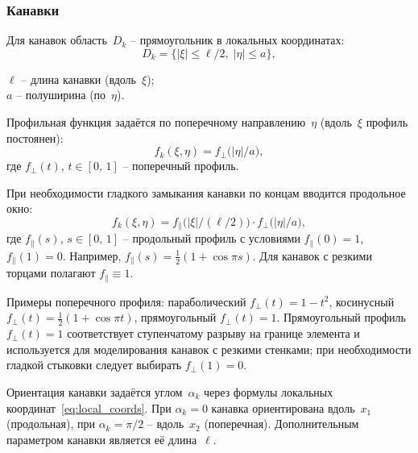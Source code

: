 
\subsubsection*{Канавки}

Для канавок область~$D_k$ -- прямоугольник в локальных координатах:
\begin{equation}
  D_k = \bigl\{|\xi| \leq \ell/2,\; |\eta| \leq a\bigr\},
  \label{eq:groove_Dk}
\end{equation}
\begin{conditions}
$\ell$ -- длина канавки (вдоль~$\xi$);\\
$a$ -- полуширина (по~$\eta$).
\end{conditions}
Профильная функция задаётся по поперечному направлению~$\eta$
(вдоль~$\xi$ профиль постоянен):
\begin{equation}
  f_k(\xi, \eta) = f_\perp\!\bigl(|\eta|/a\bigr),
  \label{eq:groove_profile}
\end{equation}
где $f_\perp(t)$, $t \in [0,\,1]$ -- поперечный профиль.

При необходимости гладкого замыкания канавки по концам вводится
продольное окно:
\begin{equation}
  f_k(\xi, \eta)
    = f_\parallel\!\bigl(|\xi|/(\ell/2)\bigr)
      \cdot f_\perp\!\bigl(|\eta|/a\bigr),
  \label{eq:groove_profile_window}
\end{equation}
где $f_\parallel(s)$, $s \in [0,\,1]$ -- продольный профиль
с условиями $f_\parallel(0) = 1$, $f_\parallel(1) = 0$. Например,
$f_\parallel(s) = \frac{1}{2}(1 + \cos\pi s)$. Для канавок
с резкими торцами полагают $f_\parallel \equiv 1$.

Примеры поперечного профиля:
параболический $f_\perp(t) = 1 - t^2$,
косинусный $f_\perp(t) = \frac{1}{2}(1 + \cos\pi t)$,
прямоугольный $f_\perp(t) = 1$.
Прямоугольный профиль $f_\perp(t) = 1$ соответствует ступенчатому
разрыву на границе элемента и используется для моделирования канавок
с резкими стенками; при необходимости гладкой стыковки следует
выбирать $f_\perp(1) = 0$.

Ориентация канавки задаётся углом~$\alpha_k$ через формулы локальных
координат~\eqref{eq:local_coords}. При $\alpha_k = 0$ канавка
ориентирована вдоль~$x_1$ (продольная), при $\alpha_k = \pi/2$ --
вдоль~$x_2$ (поперечная). Дополнительным параметром канавки является
её длина~$\ell$.


